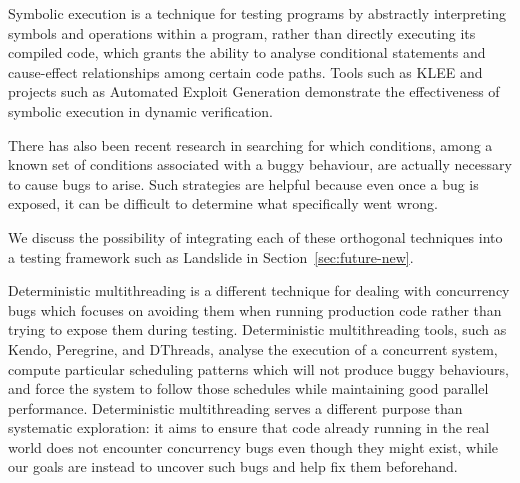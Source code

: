 Symbolic execution\cite{symbolic,symbolic-disks} is a technique for testing programs by abstractly interpreting symbols and operations within a program, rather than directly executing its compiled code, which grants the ability to analyse conditional statements and cause-effect relationships among certain code paths.
Tools such as KLEE\cite{klee} and projects such as Automated Exploit Generation\cite{aeg} demonstrate the effectiveness of symbolic execution in dynamic verification.

There has also been recent research in searching for which conditions, among a known set of conditions associated with a buggy behaviour, are actually necessary to cause bugs to arise\cite{dag-mining}. Such strategies are helpful because even once a bug is exposed, it can be difficult to determine what specifically went wrong.

We discuss the possibility of integrating each of these orthogonal techniques into a testing framework such as Landslide in Section~\ref{sec:future-new}.

Deterministic multithreading is a different technique for dealing with concurrency bugs which focuses on avoiding them when running production code rather than trying to expose them during testing. Deterministic multithreading tools, such as Kendo\cite{kendo}, Peregrine\hspace{0in}\cite{peregrine}, and DThreads\cite{dthreads}, analyse the execution of a concurrent system, compute particular scheduling patterns which will not produce buggy behaviours, and force the system to follow those schedules while maintaining good parallel performance.
Deterministic multithreading serves a different purpose than systematic exploration: it aims to ensure that code already running in the real world does not encounter concurrency bugs even though they might exist, while our goals are instead to uncover such bugs and help fix them beforehand.

